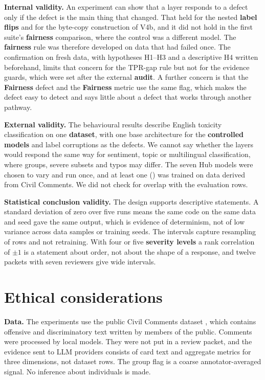 \textbf{Internal validity.} An experiment can show that a layer responds to a defect only if the defect is the main thing that changed. That held for the nested \textbf{label flips} and for the byte-copy construction of V4b, and it did not hold in the first suite's \textbf{fairness} comparison, where the control was a different model. The \textbf{fairness} rule was therefore developed on data that had failed once. The confirmation on fresh data, with hypotheses H1--H3 and a descriptive H4 written beforehand, limits that concern for the TPR-gap rule but not for the evidence guards, which were set after the external \textbf{audit}. A further concern is that the \textbf{Fairness} defect and the \textbf{Fairness} metric use the same flag, which makes the defect easy to detect and says little about a defect that works through another pathway.

\textbf{External validity.} The behavioural results describe English toxicity classification on one \textbf{dataset}, with one base architecture for the \textbf{controlled models} and label corruptions as the defects. We cannot say whether the layers would respond the same way for sentiment, topic or multilingual classification, where groups, severe subsets and typos may differ. The seven Hub models were chosen to vary and run once, and at least one () was trained on data derived from Civil Comments. We did not check for overlap with the evaluation rows.

\textbf{Statistical conclusion validity.} The design supports descriptive statements. A standard deviation of zero over five runs means the same code on the same data and seed gave the same output, which is evidence of determinism, not of low variance across data samples or training seeds. The intervals capture resampling of rows and not retraining. With four or five \textbf{severity levels} a rank correlation of $\pm1$ is a statement about order, not about the shape of a response, and twelve packets with seven reviewers give wide intervals.

\section{Ethical considerations}\label{sec:ethics}
\textbf{Data.} The experiments use the public Civil Comments dataset \cite{borkan2019}, which contains offensive and discriminatory text written by members of the public. Comments were processed by local models. They were not put in a review packet, and the evidence sent to LLM providers consists of card text and aggregate metrics for three dimensions, not dataset rows. The group flag is a coarse annotator-averaged signal. No inference about individuals is made.

